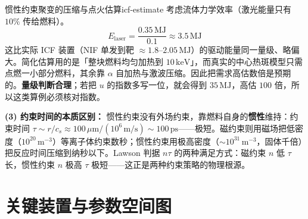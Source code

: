 \begin{example}{惯性约束聚变的压缩与点火估算}{icf-estimate}
考虑流体力学效率（激光能量只有 $10\%$ 传给燃料）。
\[
E_{\text{laser}} = \frac{0.35\,\mathrm{MJ}}{0.1} \approx 3.5\,\mathrm{MJ}
\]
这比实际 ICF 装置（NIF 单发到靶 $\approx1.8$--$2.05\,\mathrm{MJ}$）的驱动能量同一量级、略偏大。简化估算用的是「整块燃料均匀加热到 $10\,\mathrm{keV}$」，而真实的中心热斑模型只需点燃一小部分燃料，其余靠 $\alpha$ 自加热与激波压缩。因此把需求高估数倍是预期的。\textbf{量级判断合理}；若把 $u$ 的指数多写一位，就会得到 $35\,\mathrm{MJ}$，高估 $100$ 倍，所以这类算例必须核对指数。

\textbf{(3) 约束时间的本质区别：} 惯性约束没有外场约束，靠燃料自身的\textbf{惯性}维持：约束时间 $\tau \sim r/c_s \approx 100\,\mu\mathrm{m}/(10^6\,\mathrm{m/s}) \sim 100\,\mathrm{ps}$——极短。磁约束则用磁场把低密度（$10^{20}\,\mathrm{m^{-3}}$）等离子体约束数秒；惯性约束用极高密度（$\sim10^{31}\,\mathrm{m^{-3}}$，固体千倍）把反应时间压缩到纳秒以下。Lawson 判据 $n\tau$ 的两种满足方式：磁约束 $n$ 低 $\tau$ 长，惯性约束 $n$ 极高 $\tau$ 极短——这正是两种约束策略的物理根源。
\end{example}

\section{关键装置与参数空间图}

